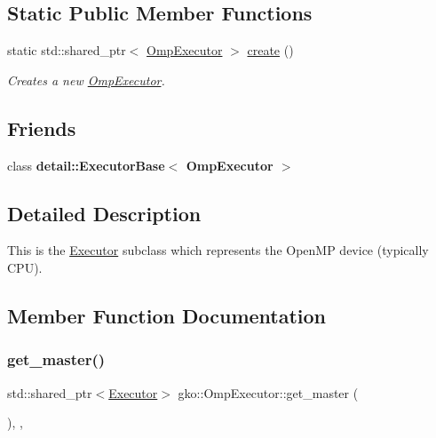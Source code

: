 \subsection*{Static Public Member Functions}
\begin{DoxyCompactItemize}
\item 
\mbox{\label{classgko_1_1OmpExecutor_a33ca05fdd0fc928ee262fc9425304874}} 
static std\+::shared\+\_\+ptr$<$ \hyperlink{classgko_1_1OmpExecutor}{Omp\+Executor} $>$ \hyperlink{classgko_1_1OmpExecutor_a33ca05fdd0fc928ee262fc9425304874}{create} ()
\begin{DoxyCompactList}\small\item\em Creates a new \hyperlink{classgko_1_1OmpExecutor}{Omp\+Executor}. \end{DoxyCompactList}\end{DoxyCompactItemize}
\subsection*{Friends}
\begin{DoxyCompactItemize}
\item 
\mbox{\label{classgko_1_1OmpExecutor_ae0f8e0210d51074eac6ca4fac7aae927}} 
class {\bfseries detail\+::\+Executor\+Base$<$ Omp\+Executor $>$}
\end{DoxyCompactItemize}


\subsection{Detailed Description}
This is the \hyperlink{classgko_1_1Executor}{Executor} subclass which represents the Open\+MP device (typically C\+PU). 

\subsection{Member Function Documentation}
\mbox{\label{classgko_1_1OmpExecutor_a5b83349e601d473cf8768c0bdbcaca8c}} 
\subsubsection{\texorpdfstring{get\+\_\+master()}{get\_master()}\hspace{0.1cm}{\footnotesize\ttfamily [1/2]}}
{\footnotesize\ttfamily std\+::shared\+\_\+ptr$<$\hyperlink{classgko_1_1Executor}{Executor}$>$ gko\+::\+Omp\+Executor\+::get\+\_\+master (\begin{DoxyParamCaption}{ }\end{DoxyParamCaption})\hspace{0.3cm}{\ttfamily [override]}, {\ttfamily [virtual]}, {\ttfamily [noexcept]}}



